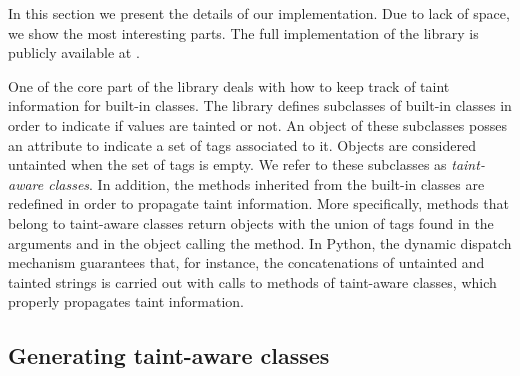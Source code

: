 \documentclass[oribibl]{llncs}
\newcommand{\nametklass}{taint-aware }
\begin{document}
In this section we present the details of our implementation. Due to lack of
space, we show the most interesting parts.
The full
implementation of the library is publicly available at \cite{PythonLib}.


One of the core part of the library 
deals with how to keep track of taint information 
for built-in classes.
The library defines 
subclasses of built-in classes
in order to indicate if values are tainted or not.
An object of these subclasses posses an attribute to indicate a set 
of tags 
associated to it. 
Objects are considered untainted when the
set of tags is empty. 
We refer to these subclasses as
\emph{\nametklass classes}.
In addition, the methods inherited from the built-in classes 
are redefined in order to propagate taint information. 
More specifically, methods that belong to 
\nametklass classes return objects with  
the union of tags found in the arguments and 
in the object calling the method. 
In Python, 
the dynamic dispatch 
mechanism guarantees that, for instance, 
the concatenations of untainted and tainted strings is carried out 
with calls to methods of \nametklass classes, which properly   
propagates taint information. %

\subsection{Generating \nametklass classes}
\label{sec:general}
\end{document}
